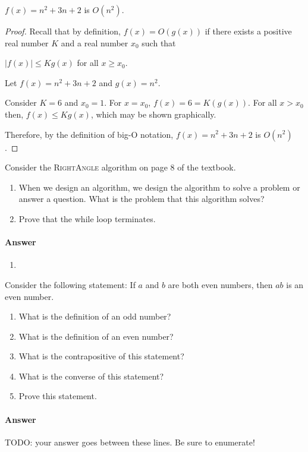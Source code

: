 \documentclass{article}
\begin{document}

\begin{theorem}
	$f(x)=n^2 + 3n +2$ is $O(n^2)$.
\end{theorem}
\begin{proof}
	Recall that by definition, $f(x) = O(g(x))$ if there exists a positive real number $K$ and a real number $x_0$
	such that

	$|f(x)|\leq K g(x)$ for all $x \geq x_0$.

	Let $f(x)=n^2 + 3n + 2$ and $g(x) = n^2$.

	Consider $K=6$ and $x_0=1$. For $x=x_0$, $f(x)=6=K(g(x))$. For all $x > x_0$ then, $f(x) \leq K g(x)$, which may
	be shown graphically. 

	Therefore, by the definition of big-O notation, $f(x)=n^2 + 3n + 2$ is $O(n^2)$.

\end{proof}




\nextprob
Consider the \textsc{RightAngle} algorithm on page 8 of the textbook.
\begin{enumerate}
    \item When we design an algorithm, we design the algorithm to solve a
        problem or answer a question.  What is the problem that this algorithm
        solves?
    \item Prove that the while loop terminates.
\end{enumerate}

\paragraph{Answer}


\begin{enumerate}
	\item
\end{enumerate}




\nextprob
Consider the following statement: If $a$ and $b$ are both even numbers, then $ab$ is
an even number.
\begin{enumerate}
    \item What is the definition of an odd number?
    \item What is the definition of an even number?
    \item What is the contrapositive of this statement?
    \item What is the converse of this statement?
    \item Prove this statement.
\end{enumerate}

\paragraph{Answer}


TODO: your answer goes between these lines.  Be sure to enumerate!

\end{document}
